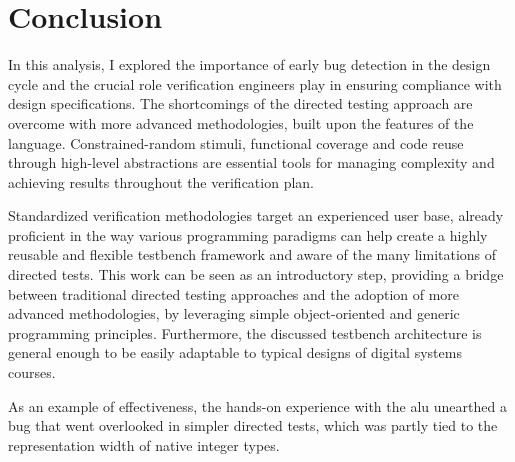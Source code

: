 \section{Conclusion} \label{sec:conclusion}
In this analysis, I explored the importance of early bug detection in the design cycle and the crucial role verification engineers play in ensuring compliance with design specifications. The shortcomings of the directed testing approach are overcome with more advanced methodologies, built upon the features of the \sv language. Constrained-random stimuli, functional coverage and code reuse through high-level abstractions are essential tools for managing complexity and achieving results throughout the verification plan.

Standardized verification methodologies target an experienced user base, already proficient in the way various programming paradigms can help create a highly reusable and flexible testbench framework and aware of the many limitations of directed tests. This work can be seen as an introductory step, providing a bridge between traditional directed testing approaches and the adoption of more advanced methodologies, by leveraging simple object-oriented and generic programming principles. Furthermore, the discussed testbench architecture is general enough to be easily adaptable to typical designs of digital systems courses.

As an example of effectiveness, the hands-on experience with the \ac{alu} unearthed a bug that went overlooked in simpler directed tests, which was partly tied to the representation width of native \vhdl integer types.